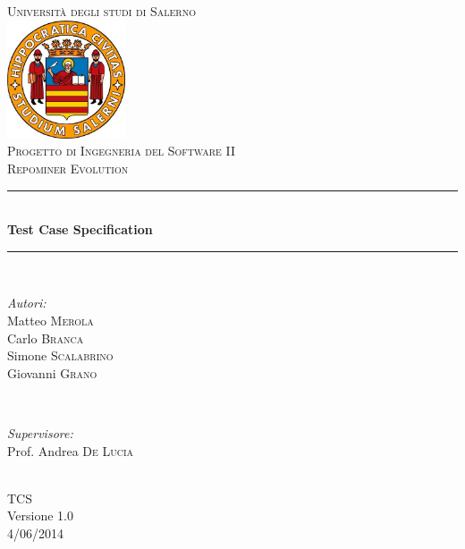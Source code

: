\documentclass[a4paper, 12pt, italian]{report}
\begin{document}
\begin{titlepage}
\newcommand{\HRule}{\rule{\linewidth}{0.5mm}} 
\center 
\textsc{\LARGE Università degli studi di Salerno}\\[1cm] 
\includegraphics[width=3.5cm]{img/logo.jpg} \\[1cm]
\textsc{\large Progetto di Ingegneria del Software II}\\[0.5cm]
\textsc{\Large Repominer Evolution}\\[0.5cm] 
 \HRule \\[0.4cm]
{ \large \bfseries Test Case Specification}\\[0.4cm] 
\HRule \\[1.5cm]

\begin{minipage}{0.4\textwidth}
\begin{flushleft} \large
\emph{Autori:}\\
Matteo \textsc{Merola}\\
Carlo \textsc{Branca}\\
Simone \textsc{Scalabrino}\\
Giovanni \textsc{Grano}\\
\end{flushleft}
\end{minipage}
~
\begin{minipage}{0.4\textwidth}
\begin{flushright} \large
\emph{Supervisore:} \\
Prof. Andrea \textsc{De Lucia}
\end{flushright}
\end{minipage}\\[2.5cm]

{\Large TCS}\\
Versione 1.0\\[1cm]

{\large 4/06/2014} %

\vfill

\end{titlepage}		
    
	\setcounter{tocdepth}{1}	
	\tableofcontents
	
	
	
	
	
\end{document}
